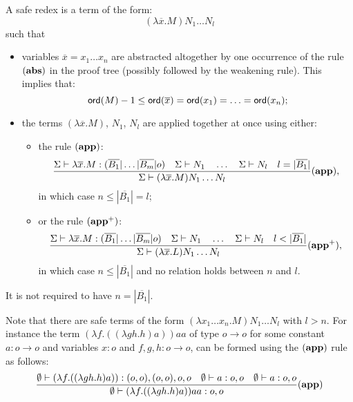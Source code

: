 \begin{dfn}
A safe redex is a term of the form:
$$(\lambda \overline{x} . M) N_1 \ldots N_l$$
such that
\begin{itemize}
  \item variables $\overline{x}=x_1\ldots x_n$ are abstracted
altogether by one occurrence of the rule $\mathbf{(abs)}$ in the
proof tree (possibly followed by the weakening rule). This implies
that:
$${\sf ord}(M) -1 \leq {\sf ord}(\overline{x}) = {\sf ord}(x_1) = \ldots = {\sf ord}(x_n);$$
\item the terms $(\lambda \overline{x} . M)$, $N_1$,
$N_l$ are applied together at once using either:
\begin{itemize}
    \item the rule $\mathbf{(app)}$:
        $$   \frac{\displaystyle 
                    \Sigma \vdash \lambda \overline{x} . M : (\overline{B_1}|\ldots|\overline{B_m}|o)
                    \quad
                    \Sigma \vdash N_1         \quad \ldots \quad \Sigma \vdash N_l
                    \quad l = |\overline{B_1}|
            }{
            \Sigma \vdash (\lambda \overline{x} . M) N_1 \ldots N_l
            } (\mathbf{app}),
        $$
        in which case  $n\leq |\overline{B_1}| = l$;

\item or the rule $\mathbf{(app^+)}$:
        $$   \frac{\displaystyle 
                    \Sigma \vdash \lambda \overline{x} . M : (\overline{B_1}|\ldots|\overline{B_m}|o)
                    \quad
                    \Sigma \vdash N_1         \quad \ldots \quad \Sigma \vdash N_l
                    \quad l < |\overline{B_1}|
            }{
            \Sigma \vdash (\lambda \overline{x} . L) N_1 \ldots N_l
            } (\mathbf{app^+}),
        $$
      in which case $n \leq |\overline{B_1}|$ and no relation holds between $n$ and $l$.
\end{itemize}
\end{itemize}
It is not required to have $n = |\overline{B_1}|$.
\end{dfn}

Note that there are safe terms of the form $(\lambda x_1 \ldots x_n
. M) N_1 \ldots N_l$ with $l>n$. For instance the term $ (\lambda f
. ((\lambda g h . h) a) ) a a$ of type $o \rightarrow o$ for some
constant $a:o \rightarrow o$ and variables $x : o$ and $f,g,h:o
\rightarrow o$, can be formed using the $\mathbf{(app)}$ rule as
follows:
$$ \frac{\displaystyle 
    \emptyset \vdash (\lambda f . ((\lambda g h . h) a) ) : (o,o),(o,o),o,o
        \quad \emptyset \vdash a : o,o
        \quad \emptyset \vdash a : o,o
    }{
       \emptyset \vdash (\lambda f . ((\lambda g h . h) a) ) a a : o,o
    } \mathbf{(app)}
$$


